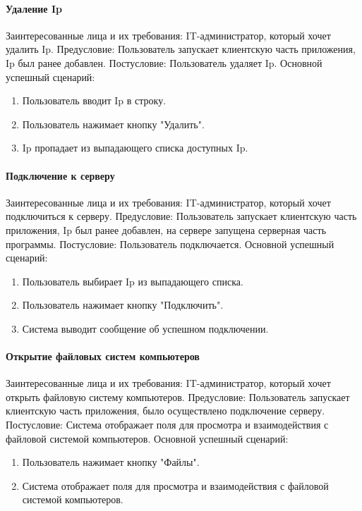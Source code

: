 \paragraph{Удаление Ip}
Заинтересованные лица и их требования: IT-администратор, который хочет удалить Ip.
Предусловие: Пользователь запускает клиентскую часть приложения, Ip был ранее добавлен.
Постусловие: Пользователь удаляет Ip.
Основной успешный сценарий:
\begin{enumerate}
	\item Пользователь вводит Ip в строку.
	\item Пользователь нажимает кнопку "Удалить".
	\item Ip пропадает из выпадающего списка доступных Ip.
\end{enumerate}

\paragraph{Подключение к серверу}
Заинтересованные лица и их требования: IT-администратор, который хочет подключиться к серверу.
Предусловие: Пользователь запускает клиентскую часть приложения, Ip был ранее добавлен, на сервере запущена серверная часть программы.
Постусловие: Пользователь подключается.
Основной успешный сценарий:
\begin{enumerate}
	\item Пользователь выбирает Ip из выпадающего списка.
	\item Пользователь нажимает кнопку "Подключить".
	\item Система выводит сообщение об успешном подключении.
\end{enumerate}

\paragraph{Открытие файловых систем компьютеров}
Заинтересованные лица и их требования: IT-администратор, который хочет открыть файловую систему компьютеров.
Предусловие: Пользователь запускает клиентскую часть приложения, было осуществлено подключение серверу.
Постусловие: Система отображает поля для просмотра и взаимодействия с файловой системой компьютеров.
Основной успешный сценарий:
\begin{enumerate}
	\item Пользователь нажимает кнопку "Файлы".
	\item Система отображает поля для просмотра и взаимодействия с файловой системой компьютеров.
\end{enumerate}

